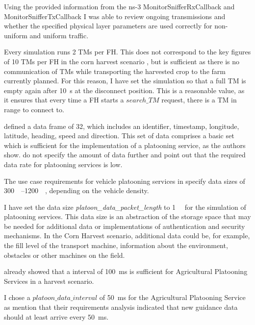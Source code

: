 Using the provided information from the ns-3 MonitorSnifferRxCallback and MonitorSnifferTxCallback I was able to review ongoing transmissions and
whether the specified physical layer parameters are used correctly for non-uniform and uniform traffic.

Every simulation runs \num{2} \ac{TM}s per \ac{FH}.
This does not correspond to the key figures of 10 \ac{TM}s per \ac{FH} in the corn harvest scenario \cite{faustzahlen2018},
but is sufficient as there is no communication of \ac{TM}s while transporting the harvested crop to the farm currently planned.
For this reason, I have set the simulation so that a full \ac{TM} is empty again after \SI{10}{\second} at the disconnect position.
This is a reasonable value, as it ensures that every time a \ac{FH} starts a $search\_TM$ request, there is a \ac{TM} in range to connect to.

\textcite{zhang_method_2009} defined a data frame of \SI{32}{\byte}, which includes an identifier, timestamp, longitude,
latitude, heading, speed and direction.
This set of data comprises a basic set which is sufficient for the implementation of a platooning service,
as the authors show.
\textcite{schlingmann_aef_2019} do not specify the amount of data further and point out that the required data rate
for platooning services is low.

The use case requirements for vehicle platooning services in \cite{TR-22.886} specify data sizes of \SIrange{300}{1200}{\kilo\byte},
depending on the vehicle density.

I have set the data size \textit{platoon\_data\_packet\_length} to \SI{1}{\kilo\byte} for the simulation of platooning services.
This data size is an abstraction of the storage space that may be needed for additional data or implementations
of authentication and security mechanisms.
In the Corn Harvest scenario, additional data could be, for example, the fill level of the transport machine,
information about the environment, obstacles or other machines on the field.

\textcite{zhang_method_2009} already showed that a interval of \SI{100}{\milli\second} is sufficient for Agricultural Platooning Services
in a harvest scenario.

I chose a $platoon\_data\_interval$ of \SI{50}{\milli\second} for the Agricultural Platooning Service
as \textcite{smolnik_5g_2020} mention that their requirements analysis indicated that new guidance data should at least arrive every \SI{50}{\milli\second}.


